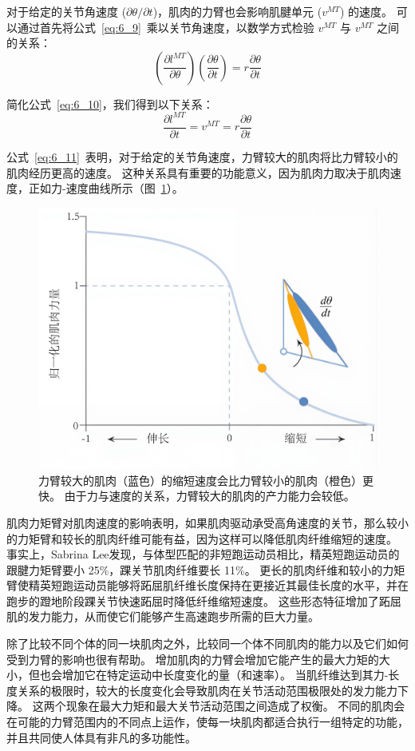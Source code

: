 对于给定的关节角速度 ($\partial \theta / \partial t$)，肌肉的力臂也会影响肌腱单元 ($v^{MT}$) 的速度。
可以通过首先将公式~\ref{eq:6_9}~乘以关节角速度，以数学方式检验 $v^{MT}$ 与 $v^{MT}$ 之间的关系：
%
\begin{equation}
	(
		\frac{\partial l^{MT}}{\partial \theta}
	)
	(
		\frac{\partial \theta}{\partial t}
	)
	=
	r \frac{\partial \theta}{\partial t}
	\label{eq:6_10}
\end{equation}


简化公式~\ref{eq:6_10}，我们得到以下关系：
%
\begin{equation}
	\frac{\partial l^{MT}}{\partial t}
	=
	v^{MT}
	=
	r \frac{\partial \theta}{\partial t}
	\label{eq:6_11}
\end{equation}


公式~\ref{eq:6_11}~表明，对于给定的关节角速度，力臂较大的肌肉将比力臂较小的肌肉经历更高的速度。
这种关系具有重要的功能意义，因为肌肉力取决于肌肉速度，正如力-速度曲线所示（图~\ref{fig:6_8}）。


\begin{figure}[!htb]
	\centering
	\includegraphics[width=0.6\linewidth]{chap6/6_8}
	\caption{力臂较大的肌肉（蓝色）的缩短速度会比力臂较小的肌肉（橙色）更快。
		由于力与速度的关系，力臂较大的肌肉的产力能力会较低。 \label{fig:6_8}}
\end{figure}


肌肉力矩臂对肌肉速度的影响表明，如果肌肉驱动承受高角速度的关节，那么较小的力矩臂和较长的肌肉纤维可能有益，因为这样可以降低肌肉纤维缩短的速度。
事实上，Sabrina Lee\cite{lee2009built}发现，与体型匹配的非短跑运动员相比，精英短跑运动员的跟腱力矩臂要小 25\%，踝关节肌肉纤维要长 11\%。
更长的肌肉纤维和较小的力矩臂使精英短跑运动员能够将跖屈肌纤维长度保持在更接近其最佳长度的水平，并在跑步的蹬地阶段踝关节快速跖屈时降低纤维缩短速度。
这些形态特征增加了跖屈肌的发力能力，从而使它们能够产生高速跑步所需的巨大力量。


除了比较不同个体的同一块肌肉之外，比较同一个体不同肌肉的能力以及它们如何受到力臂的影响也很有帮助。
增加肌肉的力臂会增加它能产生的最大力矩的大小，但也会增加它在特定运动中长度变化的量（和速率）。
当肌纤维达到其力-长度关系的极限时，较大的长度变化会导致肌肉在关节活动范围极限处的发力能力下降。
这两个现象在最大力矩和最大关节活动范围之间造成了权衡。
不同的肌肉会在可能的力臂范围内的不同点上运作，使每一块肌肉都适合执行一组特定的功能，并且共同使人体具有非凡的多功能性。


